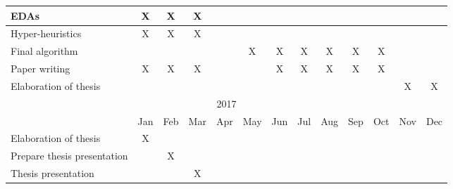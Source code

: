 \documentclass{beamer}
\begin{document}
{\begin{minipage}{\textwidth}
\begin{table}[htbp]
\begin{tabular}{|l|c|c|c|c|c|c|c|c|c|c|c|c|}
		EDAs & \cellcolor{tbGreen}X & \cellcolor{tbGreen}X & \cellcolor{tbGreen}X &  &  &  &  &  &  &  &  &  \\ \hline
		Hyper-heuristics & \cellcolor{tbGreen}X & \cellcolor{tbGreen}X & \cellcolor{tbGreen}X &  &  &  &  &  &  &  &  &  \\ \hline
		Final algorithm &  &  &  &  & X & X & X & X & X & X &  &  \\ \hline
		Paper writing & \cellcolor{tbGreen}X & \cellcolor{tbGreen}X & \cellcolor{tbGreen}X &  &  & X & X & X & X & X &  &  \\ \hline
		Elaboration of thesis &  &  &  &  &  &  &  &  &  &  & X & X \\ \hline
		\multicolumn{ 13}{|c|}{2017} \\ \hline
		& Jan & Feb & Mar & Apr & May & Jun & Jul & Aug & Sep & Oct & Nov & Dec \\ \hline
		Elaboration of thesis & X &  &  & \multicolumn{1}{l|}{} & \multicolumn{1}{l|}{} & \multicolumn{1}{l|}{} & \multicolumn{1}{l|}{} & \multicolumn{1}{l|}{} & \multicolumn{1}{l|}{} & \multicolumn{1}{l|}{} & \multicolumn{1}{l|}{} & \multicolumn{1}{l|}{} \\ \hline
		Prepare thesis presentation & \multicolumn{1}{l|}{} & X &  & \multicolumn{1}{l|}{} & \multicolumn{1}{l|}{} & \multicolumn{1}{l|}{} & \multicolumn{1}{l|}{} & \multicolumn{1}{l|}{} & \multicolumn{1}{l|}{} & \multicolumn{1}{l|}{} & \multicolumn{1}{l|}{} & \multicolumn{1}{l|}{} \\ \hline
		Thesis presentation & \multicolumn{1}{l|}{} &  & X & \multicolumn{1}{l|}{} & \multicolumn{1}{l|}{} & \multicolumn{1}{l|}{} & \multicolumn{1}{l|}{} & \multicolumn{1}{l|}{} & \multicolumn{1}{l|}{} & \multicolumn{1}{l|}{} & \multicolumn{1}{l|}{} & \multicolumn{1}{l|}{} \\ \hline
	\end{tabular}
\end{table}
	\end{minipage}
}

\end{document}
